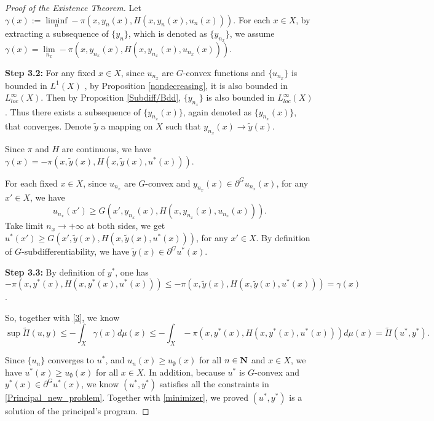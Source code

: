 \begin{proof}[Proof of the Existence Theorem]
	Let $\gamma(x):=\liminf\limits_{n} - \pi(x, y_n(x), H(x,y_n(x),u_n(x)))$. 
 For each $x\in X$, by extracting a subsequence of $\{y_{n} \}$, which is denoted as $\{y_{n_x}\}$, we assume $\gamma(x) = \lim\limits_{n_x} - \pi(x, y_{n_x}(x), H(x,y_{n_x}(x),u_{n_x}(x)))$. \medskip
	
	{\bf Step 3.2: } For any fixed $x \in X$, since $u_{n_x}$ are $G$-convex functions and $\{u_{n_x}\}$ is bounded in $L^1(X)$%
	, by Proposition \ref{nondecreasing}, it is also bounded in $L_{loc}^{\infty}(X)$. 	Then by Proposition \ref{Subdiff/Bdd}, $\{y_{n_x}\}$ is also bounded in $L_{loc}^{\infty}(X)$ . Thus there exists a subsequence of $\{y_{n_x}(x)\}$, again denoted as $\{y_{n_x}(x)\}$, that converges. Denote $\tilde{y}$ a mapping on $X$ such that $y_{n_x}(x) \rightarrow \tilde{y}(x)$.\medskip
	
	Since $\pi$ and $H$ are continuous, we have $ \gamma(x)= - \pi(x, \tilde{y}(x), H(x,\tilde{y}(x),u^*(x)))$.\medskip
	
	For each fixed $x\in X$, since $u_{n_x}$ are $G$-convex and $y_{n_x}(x) \in \partial^G u_{n_x}(x)$, for any $x' \in X$, we have $$u_{n_x}(x')\ge G(x', y_{n_x}(x),H(x,y_{n_x}(x),u_{n_x}(x))).$$ 
	Take limit $n_x \rightarrow +\infty$ at both sides, we get $u^*(x')\ge G(x', \tilde{y}(x),H(x,\tilde{y}(x),u^*(x)))$, for any $x'\in X$. By definition of $G$-subdifferentiability, we have $\tilde{y}(x)\in \partial^Gu^*(x)$. \medskip


	{\bf Step 3.3: } By definition of $y^*$, one has $$ -\pi(x, y^*(x), H(x,y^*(x),u^*(x)))\le   -\pi(x, \tilde{y}(x), H(x,\tilde{y}(x),u^*(x))) = \gamma(x)$$.
	
	So, together with \eqref{3}, we know 
	\begin{equation}\label{minimizer}
	\sup \tilde{\Pi}(u,y) \le - \int_{X}  \gamma(x) d\mu(x) \le - \int_{X}  - \pi(x, y^*(x), H(x,y^*(x),u^*(x))) d\mu(x) = \tilde{\Pi}(u^*,y^*).
	\end{equation}
	
	
	Since $\{u_n\}$ converges to $u^*$, and $u_n(x)\ge u_{\emptyset}(x)$ for all $n\in \mathbf{N}$ and $x \in X$, we have $u^*(x)\ge u_{\emptyset}(x)$ for all $x \in X$. In addition, because $u^*$ is $G$-convex and $y^*(x) \in \partial^G u^*(x)$, we know $(u^*, y^*)$ satisfies all the constraints in \eqref{Principal_new_problem}. Together with \eqref{minimizer}, we proved $(u^*,y^*)$ is a solution of the principal's program.
\end{proof}



